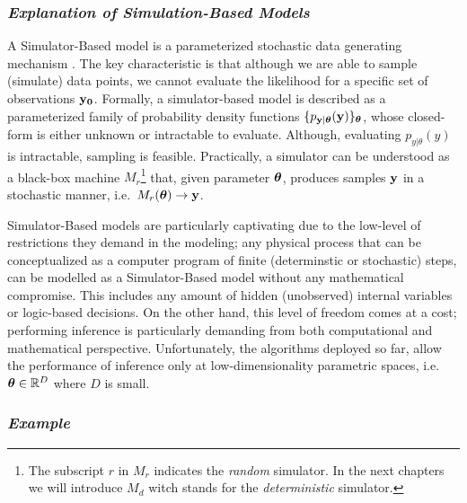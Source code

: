 \subsubsection*{\textit{Explanation of Simulation-Based Models}}

A Simulator-Based model is a parameterized stochastic data generating
mechanism \autocite{Gutmann2016}. The key characteristic is that
although we are able to sample (simulate) data points, we cannot
evaluate the likelihood for a specific set of observations
$\mathbf{y_0}$. Formally, a simulator-based model is described as a
parameterized family of probability density functions
$\{ p_{\mathbf{y}|\boldsymbol{\theta}}(\mathbf{y}) \}_{\boldsymbol{\theta}}$, whose closed-form is either
unknown or intractable to evaluate. Although, evaluating
$p_{y|\theta}(y)$ is intractable, sampling is feasible. Practically, a
simulator can be understood as a black-box machine $M_r$\footnote{The
  subscript $r$ in $M_r$ indicates the \textit{random} simulator. In
  the next chapters we will introduce $M_d$ witch stands for the
  \textit{deterministic} simulator.} that, given parameter $\boldsymbol{\theta}$,
produces samples $\mathbf{y}$ in a stochastic manner, i.e.\
$M_r(\boldsymbol{\theta}) \rightarrow \mathbf{y}$.

Simulator-Based models are particularly captivating due to the
low-level of restrictions they demand in the modeling; any physical
process that can be conceptualized as a computer program of finite
(determinstic or stochastic) steps, can be modelled as a
Simulator-Based model without any mathematical compromise. This
includes any amount of hidden (unobserved) internal variables or
logic-based decisions. On the other hand, this level of freedom comes
at a cost; performing inference is particularly demanding from both
computational and mathematical perspective. Unfortunately, the
algorithms deployed so far, allow the performance of inference only at
low-dimensionality parametric spaces, i.e.\ $\boldsymbol{\theta} \in \mathbb{R}^D$
where $D$ is small.

\subsubsection*{\textit{Example}}

